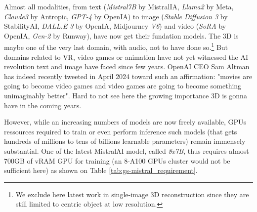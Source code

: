 Almost all modalities, from text (\textit{Mistral7B} by MistralIA, \textit{Llama2} by Meta, \textit{Claude3} by Antropic, \textit{GPT-4} by OpenIA) to image (\textit{Stable Diffusion 3} by StabilityAI, \textit{DALL.E 3} by OpenIA, Midjourney \textit{V6}) and video (\textit{SoRA} by OpenIA, \textit{Gen-2} by Runway), have now get their fundation models. The 3D is maybe one of the very last domain, with audio, not to have done so.\footnote{We exclude here latest work in single-image 3D reconstruction since they are still limited to centric object at low resolution.} But domains related to \ac{VR}, video games or animation have not yet witnessed the \ac{AI} revolution text and image have faced since few years. OpenAI CEO Sam Altman has indeed recently tweeted in April 2024 toward such an affirmation: "movies are going to become video games and video games are going to become something unimaginably better". Hard to not see here the growing importance 3D is gonna have in the coming years. 

However, while an increasing numbers of models are now freely available, \ac{GPU}s ressources required to train or even perform inference such models (that gets hundreds of millions to tens of billions learnable parameters) remain immensely substantial. One of the latest MistralAI model, called \textit{8x7B}, thus requires almost 700GB of vRAM \ac{GPU} for training (an 8-A100 \ac{GPU}s cluster would not be sufficient here) as shown on Table \ref{tab:gs-mistral_requirement}. 


